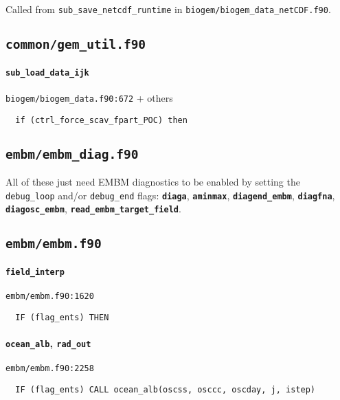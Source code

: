 \documentclass[a4paper,10pt,article]{memoir}
\begin{document}
Called from \texttt{sub\_save\_netcdf\_runtime} in
\texttt{biogem/biogem\_data\_netCDF.f90}.


\subsection*{\texttt{common/gem\_util.f90}}

\paragraph{\texttt{sub\_load\_data\_ijk}}

\texttt{biogem/biogem\_data.f90:672} + others

\begin{verbatim}
  if (ctrl_force_scav_fpart_POC) then
\end{verbatim}


\subsection*{\texttt{embm/embm\_diag.f90}}

All of these just need EMBM diagnostics to be enabled by setting the
\texttt{debug\_loop} and/or \texttt{debug\_end} flags:
\textbf{\texttt{diaga}}, \textbf{\texttt{aminmax}},
\textbf{\texttt{diagend\_embm}}, \textbf{\texttt{diagfna}},
\textbf{\texttt{diagosc\_embm}},
\textbf{\texttt{read\_embm\_target\_field}}.


\subsection*{\texttt{embm/embm.f90}}

\paragraph{\texttt{field\_interp}}

\texttt{embm/embm.f90:1620}

\begin{verbatim}
  IF (flag_ents) THEN
\end{verbatim}

\paragraph{\texttt{ocean\_alb}, \texttt{rad\_out}}

\texttt{embm/embm.f90:2258}

\begin{verbatim}
  IF (flag_ents) CALL ocean_alb(oscss, osccc, oscday, j, istep)
\end{verbatim}
\end{document}
